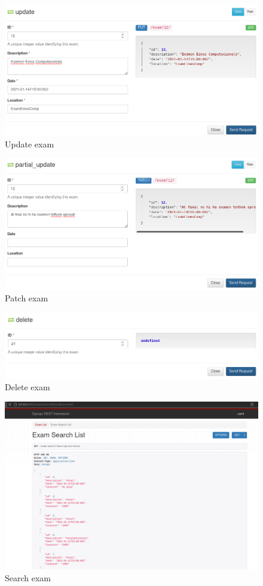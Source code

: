\documentclass[11pt]{article}
\begin{document}
\begin{figure}[htbp]
\centering
\includegraphics[width=.9\linewidth]{img/update_exam.png}
\caption{Update exam}
\end{figure}
\begin{figure}[htbp]
\centering
\includegraphics[width=.9\linewidth]{img/partial_update_exam.png}
\caption{Patch exam}
\end{figure}
\begin{figure}[htbp]
\centering
\includegraphics[width=.9\linewidth]{img/delete_exam.png}
\caption{Delete exam}
\end{figure}
\begin{figure}[htbp]
\centering
\includegraphics[width=.9\linewidth]{img/search1.png}
\caption{Search exam}
\end{figure}
\end{document}
